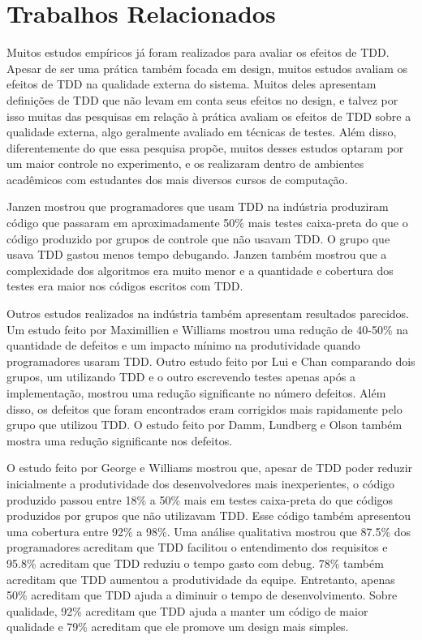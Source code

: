 \chapter{Trabalhos Relacionados}
\label{cap:trabalhos-relacionados}

Muitos estudos empíricos já foram realizados para avaliar os efeitos de TDD.
Apesar de ser uma prática também focada em design, muitos estudos avaliam
os efeitos de TDD na qualidade externa do sistema. 
Muitos deles apresentam definições
de TDD que não levam em conta seus efeitos no design, e talvez por isso muitas das 
pesquisas em relação à prática avaliam os efeitos de TDD sobre a qualidade 
externa, algo geralmente avaliado em técnicas de testes.
Além disso, diferentemente
do que essa pesquisa propõe, muitos desses estudos optaram por um
maior controle no experimento, e os realizaram dentro de ambientes acadêmicos 
com estudantes dos mais diversos cursos de computação.

Janzen \cite{janzen-arch-improvement} mostrou que programadores que usam TDD na 
indústria produziram código que passaram em aproximadamente 50\% mais testes 
caixa-preta do que o código produzido por grupos de controle que não usavam TDD.
O grupo que usava TDD gastou menos tempo debugando. Janzen também 
mostrou que a complexidade dos algoritmos era muito menor e a quantidade e
cobertura dos testes era maior nos códigos escritos com TDD.

Outros estudos realizados na indústria também apresentam resultados parecidos.
Um estudo feito por Maximillien e Williams \cite{max-e-williams} mostrou uma
redução de 40-50\% na quantidade de defeitos e um impacto mínimo na
produtividade quando programadores usaram TDD. Outro estudo feito por Lui e
Chan \cite{lui-e-chan} comparando dois grupos, um utilizando TDD e o outro 
escrevendo testes apenas após a implementação, mostrou uma redução significante 
no número defeitos. Além disso, os defeitos que foram encontrados eram 
corrigidos mais rapidamente pelo grupo que utilizou TDD. O estudo feito por 
Damm, Lundberg e Olson \cite{damn-lundberg-e-olson} também mostra uma redução
significante nos defeitos.

O estudo feito por George e Williams \cite{george-e-williams} mostrou que,
apesar de TDD poder reduzir inicialmente a produtividade dos desenvolvedores 
mais inexperientes, o código produzido passou entre 18\% a 50\% mais em testes 
caixa-preta do que códigos produzidos por grupos que não utilizavam TDD. Esse
código também apresentou uma cobertura entre 92\% a 98\%. Uma análise
qualitativa mostrou que 87.5\% dos programadores acreditam que TDD facilitou o 
entendimento dos requisitos e 95.8\% acreditam que TDD reduziu o tempo gasto com
debug. 78\% também acreditam que TDD aumentou a produtividade da equipe. 
Entretanto, apenas 50\% acreditam que TDD ajuda a diminuir o tempo de 
desenvolvimento. Sobre qualidade, 92\% acreditam que TDD ajuda a manter um
código de maior qualidade e 79\% acreditam que ele promove um design mais simples.

